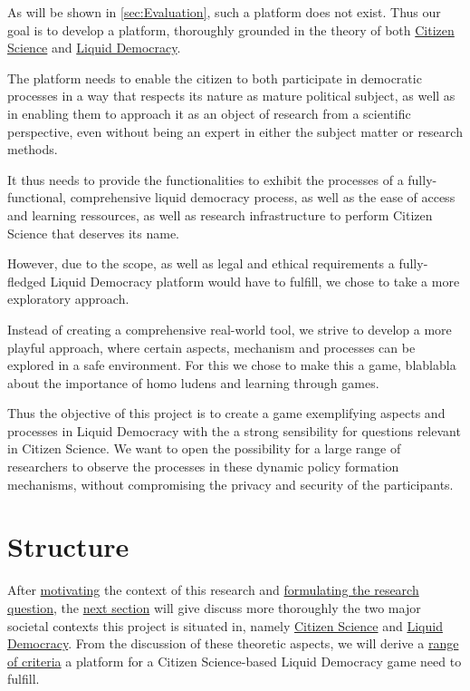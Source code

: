 As will be shown in \ref{sec:Evaluation}, such a platform does not exist. Thus our goal is to develop a platform, thoroughly grounded in the theory of both \href{sec:Theory_CS}{Citizen Science} and \href{sec:Theory_LD}{Liquid Democracy}.

The platform needs to enable the citizen to both participate in democratic processes in a way that respects its nature as mature political subject, as well as in enabling them to approach it as an object of research from a scientific perspective, even without being an expert in either the subject matter or research methods. 

It thus needs to provide the functionalities to exhibit the processes of a fully-functional, comprehensive liquid democracy process, as well as the ease of access and learning ressources, as well as research infrastructure to perform Citizen Science that deserves its name.

However, due to the scope, as well as legal and ethical requirements a fully-fledged Liquid Democracy platform would have to fulfill, we chose to take a more exploratory approach. 

Instead of creating a comprehensive real-world tool, we strive to develop a more playful approach, where certain aspects, mechanism and processes can be explored in a safe environment. For this we chose to make this a game, blablabla about the importance of homo ludens and learning through games.

Thus the objective of this project is to create a game exemplifying aspects and processes in Liquid Democracy with the a strong sensibility for questions relevant in Citizen Science. We want to open the possibility for a large range of researchers to observe the processes in these dynamic policy formation mechanisms, without compromising the privacy and security of the participants.

\section{Structure}
\label{sec:structure}


After \href{ssec:Motivation}{motivating} the context of this research and \href{ssec:Objective}{formulating the research question}, the \href{sec:Theory}{next section} will give discuss more thoroughly the two major societal contexts this project is situated in, namely \href{ssec:Theory_CS}{Citizen Science} and \href{ssec:Theory_LD}{Liquid Democracy}. From the discussion of these theoretic aspects, we will derive a \href{ssec:Criteria}{range of criteria} a platform for a Citizen Science-based Liquid Democracy game need to fulfill.

